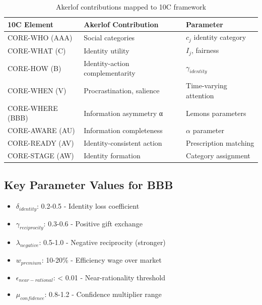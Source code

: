 \begin{table}[h]
\centering
\begin{tabular}{lll}
\textbf{10C Element} & \textbf{Akerlof Contribution} & \textbf{Parameter} \\
\hline
CORE-WHO (AAA) & Social categories & $c_j$ identity category \\
CORE-WHAT (C) & Identity utility & $I_j$, fairness \\
CORE-HOW (B) & Identity-action complementarity & $\gamma_{identity}$ \\
CORE-WHEN (V) & Procrastination, salience & Time-varying attention \\
CORE-WHERE (BBB) & Information asymmetry α & Lemons parameters \\
CORE-AWARE (AU) & Information completeness & $\alpha$ parameter \\
CORE-READY (AV) & Identity-consistent action & Prescription matching \\
CORE-STAGE (AW) & Identity formation & Category assignment \\
\end{tabular}
\caption{Akerlof contributions mapped to 10C framework}
\end{table}

\subsection{Key Parameter Values for BBB}

\begin{tcolorbox}[colback=green!5!white, colframe=green!75!black, title=Akerlof Parameters for BBB Repository]
\begin{itemize}
    \item $\delta_{identity}$: 0.2-0.5 - Identity loss coefficient
    \item $\gamma_{reciprocity}$: 0.3-0.6 - Positive gift exchange
    \item $\lambda_{negative}$: 0.5-1.0 - Negative reciprocity (stronger)
    \item $w_{premium}$: 10-20\% - Efficiency wage over market
    \item $\epsilon_{near-rational}$: < 0.01 - Near-rationality threshold
    \item $\mu_{confidence}$: 0.8-1.2 - Confidence multiplier range
\end{itemize}
\end{tcolorbox}

